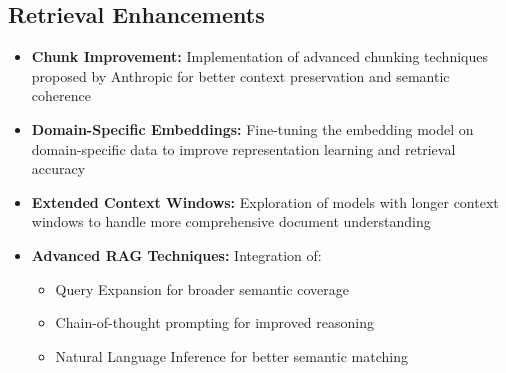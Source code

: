 \subsection{Retrieval Enhancements}
\begin{itemize}
    \item \textbf{Chunk Improvement:} Implementation of advanced chunking techniques proposed by Anthropic\cite{anthropic2024chunking} for better context preservation and semantic coherence
    
    \item \textbf{Domain-Specific Embeddings:} Fine-tuning\cite{tian2023finetuninglanguagemodelsfactuality} the embedding model on domain-specific data to improve representation learning and retrieval accuracy
    
    \item \textbf{Extended Context Windows:} Exploration of models with longer context windows\cite{peng2023yarnefficientcontextwindow} to handle more comprehensive document understanding
    
    \item \textbf{Advanced RAG Techniques:} Integration of:
    \begin{itemize}
        \item Query Expansion\cite{jagerman2023queryexpansionpromptinglarge} for broader semantic coverage
        \item Chain-of-thought prompting\cite{wei2023chainofthoughtpromptingelicitsreasoning} for improved reasoning
        \item Natural Language Inference for better semantic matching
    \end{itemize}
\end{itemize}


